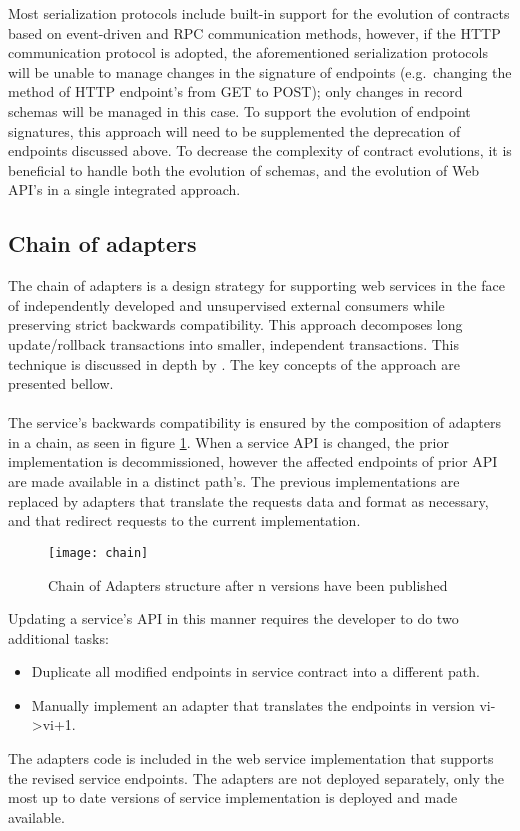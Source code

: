 Most serialization protocols include built-in support for the evolution of contracts based on event-driven and RPC communication methods,
however, if the HTTP communication protocol is adopted, the aforementioned serialization protocols will be unable to manage changes in the signature of endpoints
(e.g.\ changing the method of HTTP endpoint's from GET to POST); only changes in record schemas will be managed in this case.
To support the evolution of endpoint signatures, this approach will need to be supplemented the deprecation of endpoints discussed above.
To decrease the complexity of contract evolutions, it is beneficial to handle both the evolution of schemas, and the evolution of Web API's in a single integrated approach.

\subsection{Chain of adapters} %
\label{sec:chain_of_adapters}

The chain of adapters is a design strategy for supporting web services in the face of independently developed and unsupervised external consumers while preserving strict backwards compatibility.
This approach decomposes long update/rollback transactions into smaller, independent transactions.
This technique is discussed in depth by \citeauthor{13} \cite{13}.
The key concepts of the approach are presented bellow.

\paragraph{}

The service's backwards compatibility is ensured by the composition of adapters in a chain, as seen in figure \ref{fig:chain}.
When a service API is changed, the prior implementation is decommissioned, however the affected endpoints of prior API are made available in a distinct path's.
The previous implementations are replaced by adapters that translate the requests data and format as necessary, and that redirect requests to the current implementation.

\begin{figure}[htbp]
    \centering
    \texttt{[image: chain]}
    \caption{Chain of Adapters structure
    after n versions have been published }
    \label{fig:chain}
\end{figure}

Updating a service's API in this manner requires the developer to do two additional tasks:
\begin{itemize}
    \item Duplicate all modified endpoints in service contract into a different path.
    \item Manually implement an adapter that translates the endpoints in version vi->vi+1.
\end{itemize}
The adapters code is included in the web service implementation that supports the revised service endpoints.
The adapters are not deployed separately, only the most up to date versions of service implementation is deployed and made available.

